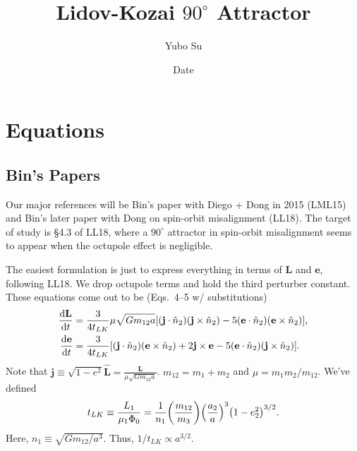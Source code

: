 \documentclass[11pt,
        usenames, %
        dvipsnames %
    ]{article}
\newcommand*{\rd}[2]{\frac{\mathrm{d}#1}{\mathrm{d}#2}}
\newcommand*{\bm}[1]{\boldsymbol{\mathbf{#1}}}
\DeclarePairedDelimiter\p{\lparen}{\rparen}
\DeclarePairedDelimiter\s{\lbrack}{\rbrack}
\begin{document}
\def\Snospace~{\S{}} %
\renewcommand*{\sectionautorefname}{\Snospace}
\renewcommand*{\appendixautorefname}{\Snospace}
\renewcommand*{\figureautorefname}{Fig.}
\renewcommand*{\equationautorefname}{Eq.}
\renewcommand*{\tableautorefname}{Tab.}


\pagestyle{fancy}
\rhead{}
\cfoot{\thepage/\pageref{LastPage}}

\title{Lidov-Kozai $90^\circ$ Attractor}
\author{Yubo Su}
\date{Date}

\maketitle


\section{Equations}

\subsection{Bin's Papers}

Our major references will be Bin's paper with Diego + Dong in 2015 (LML15) and
Bin's later paper with Dong on spin-orbit misalignment (LL18). The target of
study is \S4.3 of LL18, where a $90^\circ$ attractor in spin-orbit misalignment
seems to appear when the octupole effect is negligible.

The easiest formulation is just to express everything in terms of $\bm{L}$ and
$\bm{e}$, following LL18. We drop octupole terms and hold the third perturber
constant. These equations come out to be (Eqs.~4--5 w/ substitutions)
\begin{align}
    \rd{\bm{L}}{t} &= \frac{3}{4t_{LK}} \mu \sqrt{Gm_{12}a} \s*{
        \p*{\bm{j} \cdot \hat{n}_2} \p*{\bm{j} \times \hat{n}_2}
        - 5\p*{\bm{e} \cdot \hat{n}_2}\p*{\bm{e} \times \hat{n}_2}
        },\\
    \rd{\bm{e}}{t} &= \frac{3}{4t_{LK}} \s*{
        \p*{\bm{j} \cdot \hat{n}_2} \p*{\bm{e} \times \hat{n}_2}
        + 2\bm{j} \times \bm{e}
        - 5\p*{\bm{e} \cdot \hat{n}_2}\p*{\bm{j} \times \hat{n}_2}
        }.
\end{align}
Note that $\bm{j} \equiv \sqrt{1 - e^2}\hat{\bm{L}} = \frac{\bm{L}}{\mu
\sqrt{Gm_{12}a}}$. $m_{12} = m_1 + m_2$ and $\mu = m_1m_2/m_{12}$. We've defined
\begin{equation}
    t_{LK} \equiv \frac{L_1}{\mu_1 \Phi_0}
        = \frac{1}{n_1}\p*{\frac{m_{12}}{m_3}}
            \p*{\frac{a_2}{a}}^3
            \p*{1 - e_2^2}^{3/2}.
\end{equation}
Here, $n_1 \equiv \sqrt{Gm_{12}/a^3}$. Thus, $1 / t_{LK} \propto a^{3/2}$.
\end{document}

